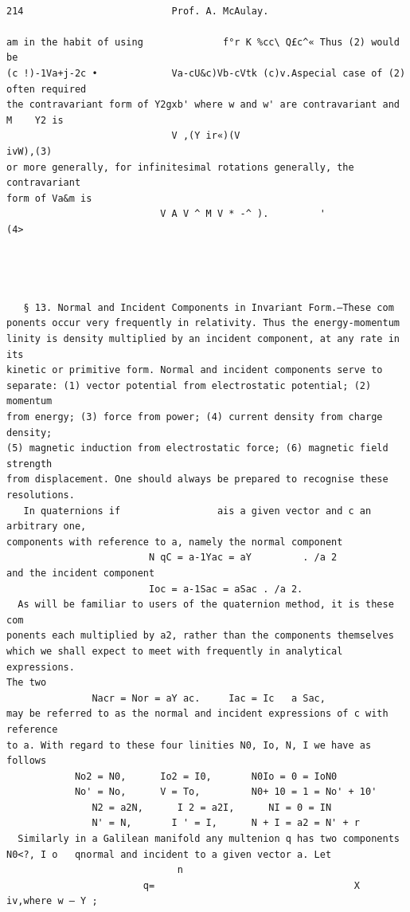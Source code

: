 \documentclass[10pt]{article}
\begin{document}
\clearpage
\begin{verbatim}

214                          Prof. A. McAulay.

am in the habit of using              f°r K %cc\ Q£c^« Thus (2) would be
(c !)-1Va+j-2c •             Va-cU&c)Vb-cVtk (c)v.Aspecial case of (2) often required
the contravariant form of Y2gxb' where w and w' are contravariant and M    Y2 is
                             V ,(Y ir«)(V                                ivW),(3)
or more generally, for infinitesimal rotations generally, the contravariant
form of Va&m is
                           V A V ^ M V * -^ ).         '                (4>




   § 13. Normal and Incident Components in Invariant Form.—These com­
ponents occur very frequently in relativity. Thus the energy-momentum
linity is density multiplied by an incident component, at any rate in its
kinetic or primitive form. Normal and incident components serve to
separate: (1) vector potential from electrostatic potential; (2) momentum
from energy; (3) force from power; (4) current density from charge density;
(5) magnetic induction from electrostatic force; (6) magnetic field strength
from displacement. One should always be prepared to recognise these
resolutions.
   In quaternions if                 ais a given vector and c an arbitrary one,
components with reference to a, namely the normal component
                         N qC = a-1Yac = aY         . /a 2
and the incident component
                         Ioc = a-1Sac = aSac . /a 2.
  As will be familiar to users of the quaternion method, it is these com­
ponents each multiplied by a2, rather than the components themselves
which we shall expect to meet with frequently in analytical expressions.
The two
               Nacr = Nor = aY ac.     Iac = Ic   a Sac,
may be referred to as the normal and incident expressions of c with reference
to a. With regard to these four linities N0, Io, N, I we have as follows
            No2 = N0,      Io2 = I0,       N0Io = 0 = IoN0
            No' = No,      V = To,         N0+ 10 = 1 = No' + 10'
               N2 = a2N,      I 2 = a2I,      NI = 0 = IN
               N' = N,       I ' = I,      N + I = a2 = N' + r
  Similarly in a Galilean manifold any multenion q has two components
N0<?, I o   qnormal and incident to a given vector a. Let
                              n
                        q=                                   X iv,where w — Y ;


\end{verbatim}
\end{document}
